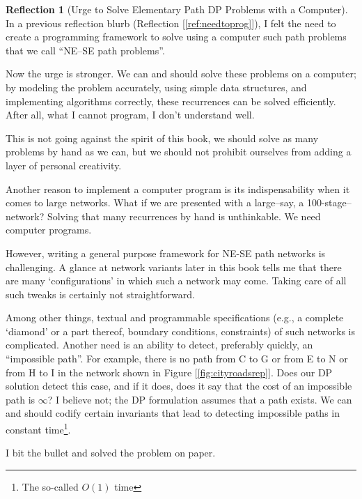 \documentclass[english,notitlepage,smartquotes]{hgbreport}
\theoremstyle{definition}
\theoremstyle{definition}
\theoremstyle{remark}
\theoremstyle{definition}
\theoremstyle{plain}
\theoremstyle{definition}
\newtheorem{reflection}{Reflection}
\begin{document}
\begin{reflection}[Urge to Solve Elementary Path DP Problems with a Computer]
In a previous reflection blurb (Reflection [\ref{ref:needtoprog}]), I felt the need to create a programming framework to solve using a computer such path problems that we call ``NE--SE path problems''. 

Now the urge is stronger. We can and should solve these problems on a computer; by modeling the problem accurately, using simple data structures, and implementing algorithms correctly, these recurrences can be solved efficiently. After all, what I cannot program, I don't understand well. 

This is not going against the spirit of this book, we should solve as many problems by hand as we can, but we should not prohibit ourselves from adding a layer of personal creativity.

Another reason to implement a computer program is its indispensability when it comes to large networks. What if we are presented with a large--say, a 100-stage--network? Solving that many recurrences by hand is unthinkable. We need computer programs.

However, writing a general purpose framework for NE-SE path networks is challenging. A glance at network variants later in this book tells me that there are many `configurations' in which such a network may come. Taking care of all such tweaks is certainly not straightforward. 

Among other things, textual and programmable specifications (e.g., a complete `diamond' or a part thereof, boundary conditions, constraints) of such networks is complicated. Another need is an ability to detect, preferably quickly, an ``impossible path''. For example, there is no path from C to G or from E to N or from H to I in the network shown in Figure [\ref{fig:cityroadsrep}]. Does our DP solution detect this case, and if it does, does it say that the cost of an impossible path is $\infty$? I believe not; the DP formulation assumes that a path exists. We can and should codify certain invariants that lead to detecting impossible paths in constant time\footnote{The so-called $O(1)$ time}.

\end{reflection}

I bit the bullet and solved the problem on paper.
\end{document}

